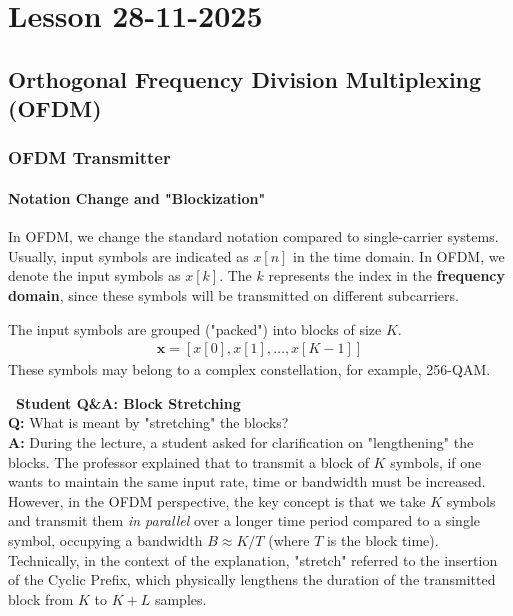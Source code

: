 \documentclass[a4paper, 12pt]{book}
\begin{document}
\setcounter{chapter}{6}
\chapter{Lesson 28-11-2025}
\section{Orthogonal Frequency Division Multiplexing (OFDM)}

\subsection{OFDM Transmitter}

\subsubsection{Notation Change and "Blockization"}
In OFDM, we change the standard notation compared to single-carrier systems. Usually, input symbols are indicated as $x[n]$ in the time domain.
In OFDM, we denote the input symbols as $x[k]$. The $k$ represents the index in the \textbf{frequency domain}, since these symbols will be transmitted on different subcarriers.

The input symbols are grouped ("packed") into blocks of size $K$.
\begin{align}
\mathbf{x} = [x[0], x[1], \dots, x[K-1]]
\end{align}
These symbols may belong to a complex constellation, for example, 256-QAM.

\noindent\colorbox{yellow!25}{
    \parbox{\dimexpr\linewidth-2\fboxsep}{
        \textbf{\faQuestionCircle\ Student Q\&A: Block Stretching} \\
        \small
        \textbf{Q:} What is meant by "stretching" the blocks? \\
        \textbf{A:} During the lecture, a student asked for clarification on "lengthening" the blocks. The professor explained that to transmit a block of $K$ symbols, if one wants to maintain the same input rate, time or bandwidth must be increased. However, in the OFDM perspective, the key concept is that we take $K$ symbols and transmit them \textit{in parallel} over a longer time period compared to a single symbol, occupying a bandwidth $B \approx K/T$ (where $T$ is the block time). Technically, in the context of the explanation, "stretch" referred to the insertion of the Cyclic Prefix, which physically lengthens the duration of the transmitted block from $K$ to $K+L$ samples.
    }
}
\end{document}
